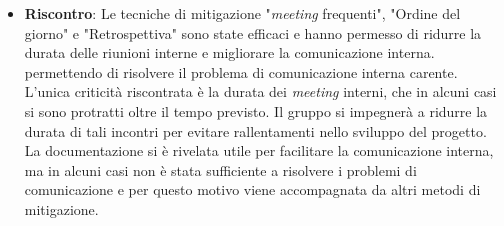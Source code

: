 \begin{itemize}
	\item \textbf{Riscontro}: Le tecniche di mitigazione "\textit{meeting} frequenti", "Ordine del giorno" e "Retrospettiva" sono state efficaci e hanno permesso di ridurre la durata delle riunioni interne e migliorare la comunicazione interna.
	permettendo di risolvere il problema di comunicazione interna carente. L'unica criticità riscontrata è la durata dei \textit{meeting} interni, che in alcuni casi si sono protratti oltre il tempo previsto. Il gruppo si impegnerà 
	a ridurre la durata di tali incontri per evitare rallentamenti nello sviluppo del progetto. La documentazione si è rivelata utile per facilitare la comunicazione interna, ma in alcuni casi non è stata sufficiente a risolvere 
	i problemi di comunicazione e per questo motivo viene accompagnata da altri metodi di mitigazione.
\end{itemize}

